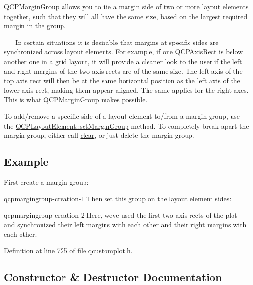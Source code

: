 \hyperlink{class_q_c_p_margin_group}{Q\+C\+P\+Margin\+Group} allows you to tie a margin side of two or more layout elements together, such that they will all have the same size, based on the largest required margin in the group.

~\newline
~\newline
 In certain situations it is desirable that margins at specific sides are synchronized across layout elements. For example, if one \hyperlink{class_q_c_p_axis_rect}{Q\+C\+P\+Axis\+Rect} is below another one in a grid layout, it will provide a cleaner look to the user if the left and right margins of the two axis rects are of the same size. The left axis of the top axis rect will then be at the same horizontal position as the left axis of the lower axis rect, making them appear aligned. The same applies for the right axes. This is what \hyperlink{class_q_c_p_margin_group}{Q\+C\+P\+Margin\+Group} makes possible.

To add/remove a specific side of a layout element to/from a margin group, use the \hyperlink{class_q_c_p_layout_element_a516e56f76b6bc100e8e71d329866847d}{Q\+C\+P\+Layout\+Element\+::set\+Margin\+Group} method. To completely break apart the margin group, either call \hyperlink{class_q_c_p_margin_group_a144b67f216e4e86c3a3a309e850285fe}{clear}, or just delete the margin group.\hypertarget{class_q_c_p_margin_group_QCPMarginGroup-example}{}\subsection{Example}\label{class_q_c_p_margin_group_QCPMarginGroup-example}
First create a margin group\+: 
\begin{DoxyCodeInclude}
\end{DoxyCodeInclude}
qcpmargingroup-\/creation-\/1 Then set this group on the layout element sides\+: 
\begin{DoxyCodeInclude}
\end{DoxyCodeInclude}
qcpmargingroup-\/creation-\/2 Here, we\textquotesingle{}ve used the first two axis rects of the plot and synchronized their left margins with each other and their right margins with each other. 

Definition at line 725 of file qcustomplot.\+h.



\subsection{Constructor \& Destructor Documentation}
\hypertarget{class_q_c_p_margin_group_ac481c20678ec5b305d6df330715f4b7b}{}
